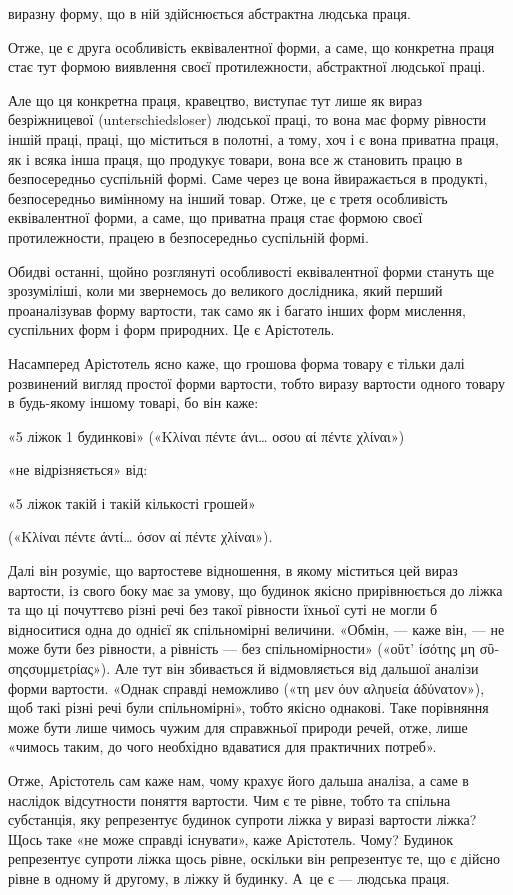 \parcont{}  %
виразну форму, що в ній здійснюється абстрактна людська праця.

Отже, це є друга особливість еквівалентної форми, а саме, що конкретна праця стає тут формою
виявлення своєї протилежности,
абстрактної людської праці.

Але що ця конкретна праця, кравецтво, виступає тут лише як вираз безріжницевої (unterschiedsloser)
людської праці, то вона має форму рівности іншій праці, праці, що міститься в полотні, а тому, хоч і
є вона приватна праця, як і всяка інша праця, що продукує товари, вона все ж становить працю в
безпосередньо суспільній формі. Саме через це вона йвиражається в продукті, безпосередньо вимінному
на інший товар. Отже, це є третя особливість еквівалентної форми, а саме, що приватна праця стає
формою своєї протилежности, працею в безпосередньо суспільній формі.

Обидві останні, щойно розглянуті особливості еквівалентної форми стануть ще зрозуміліші, коли ми
звернемось до великого дослідника, який перший проаналізував форму вартости, так само як і багато
інших форм мислення, суспільних форм і форм природних. Це є Арістотель.

Насамперед Арістотель ясно каже, що грошова форма товару є тільки далі розвинений вигляд простої
форми вартости, тобто виразу вартости одного товару в будь-якому іншому товарі, бо він каже:

\begin{center}
«5 ліжок \deq{} 1 будинкові»
(«\textgreek{Κλίναι πέντε άνι\dots{} οσου αί πέντε χλίναι}»)

«не відрізняється» від:

«5 ліжок \deq{} такій і такій кількості грошей»

(«\textgreek{Κλίναι πέντε άντί\dots{} όσον αί πέντε χλίναι}»).
\end{center}

Далі він розуміє, що вартостеве відношення, в якому міститься цей вираз вартости, із свого боку має
за умову, що будинок якісно прирівнюється до ліжка та що ці почуттєво різні речі без такої рівности
їхньої суті не могли б відноситися одна до однієї як спільномірні величини. «Обмін, — каже він, — не
може бути без рівности, а рівність — без спільномірности» («\textgreek{οΰτ’ ίσότης μη σΰσηςσυμμετρίας}»). Але
тут він збивається й відмовляється від дальшої аналізи форми вартости. «Однак справді неможливо
(«\textgreek{τη μεν όυν αληυεία άδύνατον}»), щоб такі різні речі були спільномірні», тобто якісно однакові. Таке
порівняння може бути лише чимось чужим для справжньої природи речей, отже, лише «чимось таким, до
чого необхідно вдаватися для практичних потреб».

Отже, Арістотель сам каже нам, чому крахує його дальша аналіза, а саме в наслідок відсутности
поняття вартости. Чим є те рівне, тобто та спільна субстанція, яку репрезентує будинок супроти ліжка
у виразі вартости ліжка? Щось таке «не може справді існувати», каже Арістотель. Чому? Будинок
репрезентує супроти ліжка щось рівне, оскільки він репрезентує те, що є дійсно рівне в одному й
другому, в ліжку й будинку. А~це є — людська праця.
